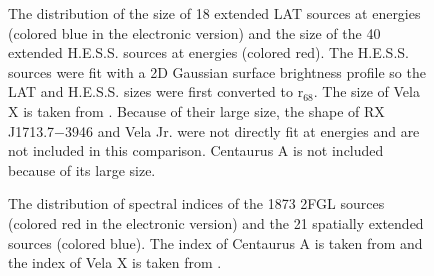 \documentclass[12pt,preprint]{aastex}
\newif\ifcolorfigure
\newcommand{\gev}{\text{GeV}\xspace}
\newcommand{\tev}{\text{TeV}\xspace}
\newcommand{\rsixeight}{{\ensuremath{\text{r}_{68}}}\xspace}
\begin{document}
\clearpage
\begin{figure}
    \ifcolorfigure
      \plotone{summary_plots/gev_vs_tev_histogram_color.eps}
    \else
    \fi
    \caption{
    The distribution of the size of 18 extended LAT sources
    at \gev energies
    (colored blue in the electronic version) and the size of the
    40 extended H.E.S.S. sources at \tev energies
    (colored red).  
    The H.E.S.S. sources were fit with a 2D Gaussian surface
    brightness profile so the LAT and H.E.S.S. sizes were first converted
    to \rsixeight. 
    The \gev size of Vela X is taken from \cite{velax}.  
    Because of their large size, the shape of RX\,J1713.7$-$3946 and
    Vela Jr. were not directly fit at \tev energies
    and are not included in this comparison.
    Centaurus A is not included because of its large size.
    }\label{gev_vs_tev_histogram}
  \end{figure}

\clearpage
\begin{figure}
    \ifcolorfigure
      \plotone{summary_plots/compare_index_2FGL_color.eps}
    \else
    \fi
    \caption{
    The distribution of spectral indices of the 1873 2FGL sources
    (colored red in the electronic version) and the 21 spatially extended
    sources (colored blue).  The index of Centaurus A is taken from
    \cite{second_cat} and the index of Vela X is taken from \cite{velax}.
    }\label{compare_index_2FGL}
  \end{figure}
\end{document}
